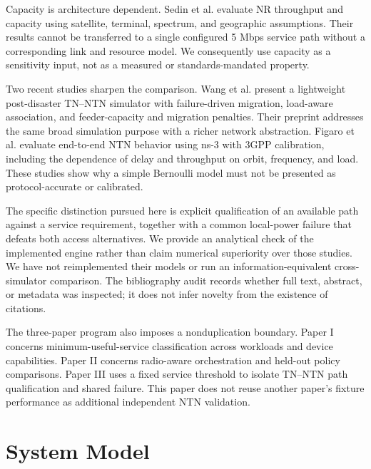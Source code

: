 \documentclass{IEEEoj}
\begin{document}
Capacity is architecture dependent. Sedin et al. \cite{sedin2020} evaluate NR throughput and capacity using satellite, terminal, spectrum, and geographic assumptions. Their results cannot be transferred to a single configured 5 Mbps service path without a corresponding link and resource model. We consequently use capacity as a sensitivity input, not as a measured or standards-mandated property.

Two recent studies sharpen the comparison. Wang et al. \cite{wang2026} present a lightweight post-disaster TN--NTN simulator with failure-driven migration, load-aware association, and feeder-capacity and migration penalties. Their preprint addresses the same broad simulation purpose with a richer network abstraction. Figaro et al. \cite{figaro2026} evaluate end-to-end NTN behavior using ns-3 with 3GPP calibration, including the dependence of delay and throughput on orbit, frequency, and load. These studies show why a simple Bernoulli model must not be presented as protocol-accurate or calibrated.

The specific distinction pursued here is explicit qualification of an available path against a service requirement, together with a common local-power failure that defeats both access alternatives. We provide an analytical check of the implemented engine rather than claim numerical superiority over those studies. We have not reimplemented their models or run an information-equivalent cross-simulator comparison. The bibliography audit records whether full text, abstract, or metadata was inspected; it does not infer novelty from the existence of citations.

The three-paper program also imposes a nonduplication boundary. Paper I concerns minimum-useful-service classification across workloads and device capabilities. Paper II concerns radio-aware orchestration and held-out policy comparisons. Paper III uses a fixed service threshold to isolate TN--NTN path qualification and shared failure. This paper does not reuse another paper's fixture performance as additional independent NTN validation.

\section{System Model}
\end{document}

